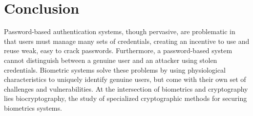 \documentclass[11pt]{article}
\begin{document}
\section{Conclusion}
Password-based authentication systems, though pervasive, are problematic in
that users must manage many sets of credentials, creating an incentive to use
and reuse weak, easy to crack passwords. Furthermore, a password-based system
cannot distinguish between a genuine user and an attacker using stolen credentials. Biometric systems solve these problems by using physiological characteristics 
to uniquely identify genuine users, but come with their own set of challenges
and vulnerabilities. At the intersection of biometrics and cryptography 
lies biocryptography, the study of specialized cryptographic methods for 
securing biometrics systems.
\singlespace
\nocite{*}

{}

\end{document}
